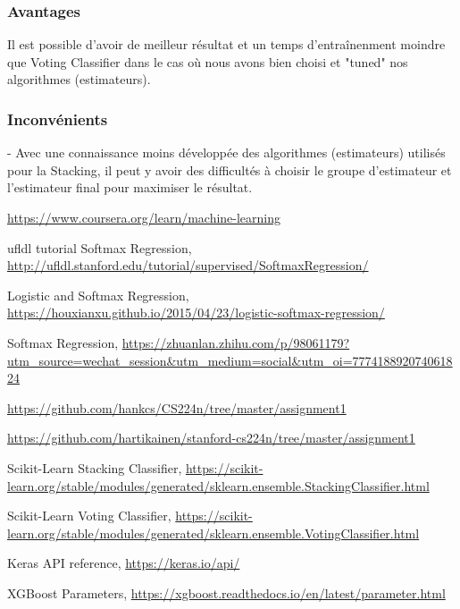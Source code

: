 \documentclass{article}
\begin{document}
\subsubsection{Avantages}
Il est possible d'avoir de meilleur résultat et un temps d'entraînenment moindre que Voting Classifier dans le cas où nous avons bien choisi et "tuned" nos algorithmes (estimateurs).

\subsubsection{Inconvénients}
- Avec une connaissance moins développée des algorithmes (estimateurs) utilisés pour la Stacking, il peut y avoir des difficultés à choisir le groupe d'estimateur et l'estimateur final pour maximiser le résultat.


\begin{thebibliography}{99}  
   \url{https://www.coursera.org/learn/machine-learning}

  ufldl tutorial Softmax Regression, \url{http://ufldl.stanford.edu/tutorial/supervised/SoftmaxRegression/}

  Logistic and Softmax Regression, \url{https://houxianxu.github.io/2015/04/23/logistic-softmax-regression/}

  Softmax Regression, \url{https://zhuanlan.zhihu.com/p/98061179?utm_source=wechat_session&utm_medium=social&utm_oi=777418892074061824}

   \url{https://github.com/hankcs/CS224n/tree/master/assignment1}

   \url{https://github.com/hartikainen/stanford-cs224n/tree/master/assignment1}


  Scikit-Learn Stacking Classifier, \url{https://scikit-learn.org/stable/modules/generated/sklearn.ensemble.StackingClassifier.html}

  Scikit-Learn Voting Classifier, \url{https://scikit-learn.org/stable/modules/generated/sklearn.ensemble.VotingClassifier.html}

  Keras API reference, \url{https://keras.io/api/}

  XGBoost Parameters, \url{https://xgboost.readthedocs.io/en/latest/parameter.html}

\end{thebibliography}
\end{document}
